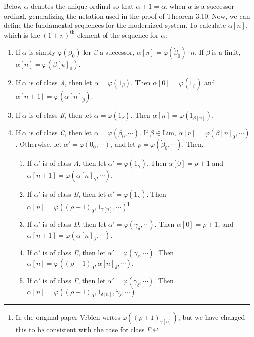 \documentclass{article}
\theoremstyle{definition}
\theoremstyle{plain}
\theoremstyle{plain}
\theoremstyle{plain}
\theoremstyle{plain}
\theoremstyle{remark}
\theoremstyle{remark}
\theoremstyle{remark}
\theoremstyle{plain}
\theoremstyle{plain}
\begin{document}
Below $\dot{\alpha}$ denotes the unique ordinal so that $\dot{\alpha}+1 = \alpha$, when $\alpha$ is a successor ordinal, generalizing the notation used in the proof of Theorem 3.10. Now, we can define the fundamental sequences for the modernized system. To calculate $\alpha[n]$, which is the $(1+n)^\mathrm{th}$ element of the sequence for $\alpha$:

\begin{enumerate}
    \item If $\alpha$ is simply $\varphi(\beta_0)$ for $\beta$ a successor, $\alpha[n] = \varphi(\dot{\beta}_0) \cdot n$. If $\beta$ is a limit, $\alpha[n] = \varphi(\beta[n]_0)$.
    \item If $\alpha$ is of class \textit{A}, then let $\alpha = \varphi(1_\beta)$. Then $\alpha[0] = \varphi(1_{\dot{\beta}})$ and $\alpha[n+1] = \varphi(\alpha[n]_{\dot{\beta}})$.
    \item If $\alpha$ is of class \textit{B}, then let $\alpha = \varphi(1_\beta)$. Then $\alpha[n] = \varphi(1_{\beta[n]})$.
    \item If $\alpha$ is of class \textit{C}, then let $\alpha = \varphi(\beta_0, \cdots)$. If $\beta \in \mathrm{Lim}$, $\alpha[n] = \varphi(\beta[n]_0, \cdots)$. Otherwise, let $\alpha' = \varphi(0_0, \cdots)$, and let $\rho = \varphi(\dot{\beta}_0, \cdots)$. Then,
    \begin{enumerate}
        \item If $\alpha'$ is of class \textit{A}, then let $\alpha' = \varphi(1_\gamma)$. Then $\alpha[0] = \rho+1$ and $\alpha[n+1] = \varphi(\alpha[n]_{\dot{\gamma}}, \cdots)$.
        \item If $\alpha'$ is of class \textit{B}, then let $\alpha' = \varphi(1_\gamma)$. Then $\alpha[n] = \varphi((\rho+1)_0,1_{\gamma[n]}, \cdots)$\footnote{In the original paper Veblen writes $\varphi((\rho+1)_{\gamma[n]})$, but we have changed this to be consistent with the case for class \textit{F}.}.
        \item If $\alpha'$ is of class \textit{D}, then let $\alpha' = \varphi(\gamma_\delta, \cdots)$. Then $\alpha[0] = \rho+1$, and $\alpha[n+1] = \varphi(\alpha[n]_{\dot{\delta}}, \cdots)$.
        \item If $\alpha'$ is of class \textit{E}, then let $\alpha' = \varphi(\gamma_\delta, \cdots)$. Then $\alpha[n] = \varphi((\rho+1)_0, \alpha[n]_\delta, \cdots)$.
        \item If $\alpha'$ is of class \textit{F}, then let $\alpha' = \varphi(\gamma_\delta, \cdots)$. Then $\alpha[n] = \varphi((\rho+1)_0,1_{\delta[n]}, \dot{\gamma}_\delta, \cdots)$.

\end{enumerate}
\end{enumerate}
\end{document}
